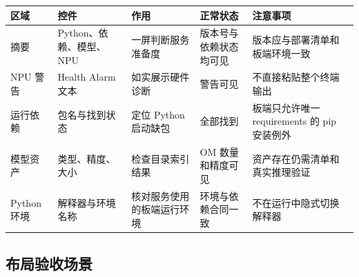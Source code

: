 \begin{longtable}[]{@{}
  >{\raggedright\arraybackslash}p{}
  >{\raggedright\arraybackslash}p{}
  >{\raggedright\arraybackslash}p{}
  >{\raggedright\arraybackslash}p{}
  >{\raggedright\arraybackslash}p{}@{}}
\toprule\noalign{}
\begin{minipage}[b]{\linewidth}\raggedright
区域
\end{minipage} & \begin{minipage}[b]{\linewidth}\raggedright
控件
\end{minipage} & \begin{minipage}[b]{\linewidth}\raggedright
作用
\end{minipage} & \begin{minipage}[b]{\linewidth}\raggedright
正常状态
\end{minipage} & \begin{minipage}[b]{\linewidth}\raggedright
注意事项
\end{minipage} \\
\midrule\noalign{}
\endhead
\bottomrule\noalign{}
\endlastfoot
摘要 & Python、依赖、模型、NPU & 一屏判断服务准备度 &
版本号与依赖状态均可见 & 版本应与部署清单和板端环境一致 \\
NPU 警告 & Health Alarm 文本 & 如实展示硬件诊断 & 警告可见 &
不直接粘贴整个终端输出 \\
运行依赖 & 包名与找到状态 & 定位 Python 启动缺包 & 全部找到 &
板端只允许唯一 requirements 的 pip 安装例外 \\
模型资产 & 类型、精度、大小 & 检查目录索引结果 & OM 数量和精度可见 &
资产存在仍需清单和真实推理验证 \\
Python 环境 & 解释器与环境名称 & 核对服务使用的板端运行环境 &
环境与依赖合同一致 & 不在运行中隐式切换解释器 \\
\end{longtable}

\subsection{布局验收场景}\label{src-experiment-case3-viewport-matrix}


